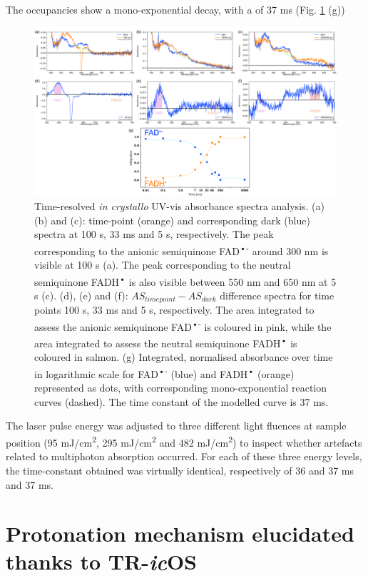 The occupancies show a mono-exponential decay, with a \texttau of 37 ms (Fig. \ref{fig:TRicOS_CraCRY} (g))
\begin{figure}[H]
  \centering
  \includegraphics[width=\textwidth]{images/cracry/TRicOS_cracry.pdf}
  \hfill
  \caption{Time-resolved \textit{in crystallo} UV-vis absorbance spectra analysis. (a) (b) and (c): time-point (orange) and corresponding dark (blue) spectra at 100 \textmu s, 33 ms and 5 s, respectively. The peak corresponding to the anionic semiquinone FAD\textsuperscript{•-} around 300 nm is visible at 100 \textmu s (a). The peak corresponding to the neutral semiquinone FADH\textsuperscript{•} is also visible between 550 nm and 650 nm at 5 s (c). (d), (e) and (f): \(AS_{time point}-AS_{dark}\) difference spectra for time points 100 \textmu s, 33 ms and 5 s, respectively. The area integrated to assess the anionic semiquinone FAD\textsuperscript{•-} is coloured in pink, while the area integrated to assess the neutral semiquinone FADH\textsuperscript{•} is coloured in salmon. (g) Integrated, normalised absorbance over time in logarithmic scale for FAD\textsuperscript{•-} (blue) and FADH\textsuperscript{•} (orange) represented as dots, with corresponding mono-exponential reaction curves (dashed). The time constant of the modelled curve is 37 ms.}\label{fig:TRicOS_CraCRY}
\end{figure}

The laser pulse energy was adjusted to three different light fluences at sample position (95 mJ/cm\textsuperscript{2}, 295 mJ/cm\textsuperscript{2} and 482 mJ/cm\textsuperscript{2}) to inspect whether artefacts related to multiphoton absorption occurred. For each of these three energy levels, the time-constant obtained was virtually identical, respectively of 36 and 37 ms and 37 ms.

\section{Protonation mechanism elucidated thanks to TR-\textit{ic}OS}

